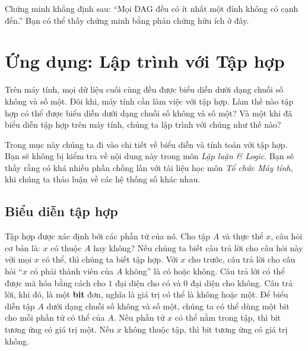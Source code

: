 \begin{exercise}
Chứng minh khẳng định sau: ``Mọi DAG đều có ít nhất một đỉnh không có cạnh đến.'' Bạn có thể thấy chứng minh bằng phản chứng hữu ích ở đây.
\end{exercise}


\section{Ứng dụng: Lập trình với Tập hợp}

Trên máy tính, mọi dữ liệu cuối cùng đều được biểu diễn dưới dạng chuỗi số không và số một. Đôi khi, máy tính cần làm việc với tập hợp. Làm thế nào tập hợp có thể được biểu diễn dưới dạng chuỗi số không và số một? Và một khi đã biểu diễn tập hợp trên máy tính, chúng ta lập trình với chúng như thế nào?

\begin{warningbox}
Trong mục này chúng ta đi vào chi tiết về biểu diễn và tính toán với tập hợp. Bạn sẽ không bị kiểm tra về nội dung này trong môn \textit{Lập luận \& Logic}. Bạn sẽ thấy rằng có khá nhiều phần chồng lấn với tài liệu học môn \textit{Tổ chức Máy tính}, khi chúng ta thảo luận về các hệ thống số khác nhau.
\end{warningbox}

\subsection{Biểu diễn tập hợp}

Tập hợp được xác định bởi các phần tử của nó. Cho tập $A$ và thực thể $x$, câu hỏi cơ bản là: $x$ có thuộc $A$ hay không? Nếu chúng ta biết câu trả lời cho câu hỏi này với mọi $x$ có thể, thì chúng ta biết tập hợp. Với $x$ cho trước, câu trả lời cho câu hỏi ``$x$ có phải thành viên của $A$ không'' là có hoặc không. Câu trả lời có thể được mã hóa bằng cách cho $1$ đại diện cho có và $0$ đại diện cho không. Câu trả lời, khi đó, là một \textbf{bit} đơn, nghĩa là giá trị có thể là không hoặc một. Để biểu diễn tập $A$ dưới dạng chuỗi số không và số một, chúng ta có thể dùng một bit cho mỗi phần tử có thể của $A$. Nếu phần tử $x$ có thể nằm trong tập, thì bit tương ứng có giá trị một. Nếu $x$ không thuộc tập, thì bit tương ứng có giá trị không.

